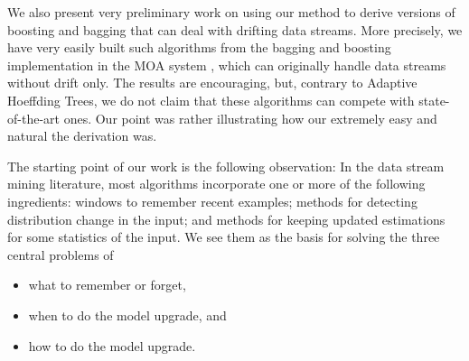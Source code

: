 \ENDOMIT

\BEGINOMIT
We also present very preliminary work on using our method to derive 
versions of boosting and bagging that can deal with drifting data streams. 
More precisely, we have very easily built such algorithms from the bagging and boosting
implementation in the MOA system \cite{MOA}, which can originally handle data streams
without drift only. The results are encouraging, but, contrary to Adaptive Hoeffding Trees, 
we do not claim that these algorithms can compete with state-of-the-art ones. 
Our point was rather illustrating how our extremely easy and natural the derivation was. 



\label{Sframework}

The starting point of our work is the following observation: 
In the data stream mining literature, %
most algorithms incorporate one or more of the following ingredients: 
windows to remember recent examples; methods for detecting distribution change in the input; 
and methods for keeping updated estimations for some statistics of the input. 
We see them as the basis for solving the three central problems of

\begin{itemize}
 \item  what to remember or forget,
 \item  when to do the model upgrade, and  
 \item  how to do the model upgrade.
\end{itemize}

